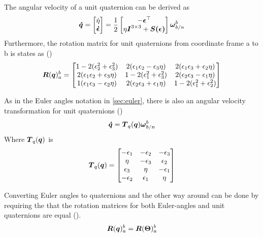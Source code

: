 The angular velocity of a unit quaternion can be derived as
\begin{equation}
  \boldsymbol{\dot{q}}=
  \begin{bmatrix}
    \dot{\eta}\\
    \boldsymbol{\dot{\epsilon}}
  \end{bmatrix}
  =\frac{1}{2}
  \begin{bmatrix}
    -\boldsymbol{\epsilon}^\top\\
    \eta \boldsymbol{I}^{3 \times 3}+\boldsymbol{S(\epsilon)}
  \end{bmatrix}
  \boldsymbol{\omega}_{b/n}^{b}
\end{equation}
Furthermore, the rotation matrix for unit quaternions from coordinate frame a to b is states as (\cite{Fossen2011})
\begin{equation}\label{eq:rotMatQua}
\boldsymbol{R}(\boldsymbol{q})_a^b=
  \begin{bmatrix}
    1-2(\epsilon_2^2+\epsilon_3^2) & 2(\epsilon_1 \epsilon_2 -\epsilon_3 \eta) & 2(\epsilon_1 \epsilon_3 + \epsilon_2 \eta)\\
    2(\epsilon_1 \epsilon_2 + \epsilon_3 \eta) & 1-2(\epsilon_1^2+\epsilon_3^2) & 2(\epsilon_2 \epsilon_3 - \epsilon_1 \eta)\\
    1(\epsilon_1 \epsilon_3 - \epsilon_2 \eta) & 2(\epsilon_2 \epsilon_3 + \epsilon_1 \eta) & 1-2(\epsilon_1^2+\epsilon_2^2)
  \end{bmatrix}
\end{equation}

As in the Euler angles notation in \ref{sec:euler}, there is also an angular velocity transformation for unit quaternions (\cite{Fossen2011})
\begin{equation}
  \boldsymbol{\dot{q}}=\boldsymbol{T}_q(\boldsymbol{q})\boldsymbol{\omega}^b_{b/n}
\end{equation}
Where $\boldsymbol{T}_q(\boldsymbol{q})$ is
\begin{equation}
\boldsymbol{T}_q(\boldsymbol{q})=
  \begin{bmatrix}
    -\epsilon_1 & -\epsilon_2 & -\epsilon_3\\
    \eta & -\epsilon_3 & \epsilon_2\\
    \epsilon_3 & \eta & -\epsilon_1\\
    -\epsilon_2 & \epsilon_1 & \eta
  \end{bmatrix}
\end{equation}

Converting Euler angles to quaternions and the other way around can be done by requiring the that the rotation matrices for both Euler-angles and unit quaternions are equal (\cite{vik2009integrated}).
\begin{equation}
  \boldsymbol{R}(\boldsymbol{q})_a^b=\boldsymbol{R}(\boldsymbol{\Theta})_a^b
\end{equation}

